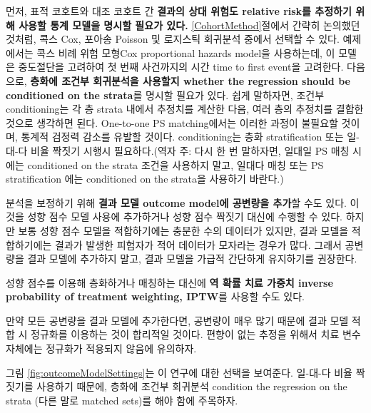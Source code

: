 \documentclass[10.5pt]{book}
\theoremstyle{definition}
\theoremstyle{definition}
\theoremstyle{definition}
\theoremstyle{remark}
\begin{document}
먼저, 표적 코호트와 대조 코호트 간 \textbf{결과의 상대 위험도 relative
risk를 추정하기 위해 사용할 통계 모델을 명시할 필요가 있다.}
\ref{CohortMethod}절에서 간략히 논의했던 것처럼, 콕스 Cox, 포아송
Poisson 및 로지스틱 회귀분석 중에서 선택할 수 있다. 예제에서는 콕스 비례
위험 모형Cox proportional hazards model을 사용하는데, 이 모델은
중도절단을 고려하여 첫 번째 사건까지의 시간 time to first event을
고려한다. 다음으로, \textbf{층화에 조건부 회귀분석을 사용할지 whether
the regression should be conditioned on the strata}를 명시할 필요가
있다. 쉽게 말하자면, 조건부 conditioning는 각 층 strata 내에서 추정치를
계산한 다음, 여러 층의 추정치를 결합한 것으로 생각하면 된다. One-to-one
PS matching에서는 이러한 과정이 불필요할 것이며, 통계적 검정력 감소를
유발할 것이다. conditioning는 층화 stratification 또는 일-대-다 비율
짝짓기 시행시 필요하다.(역자 주: 다시 한 번 말하자면, 일대일 PS 매칭
시에는 conditioned on the strata 조건을 사용하지 말고, 일대다 매칭 또는
PS stratification 에는 conditioned on the strata을 사용하기 바란다.)

분석을 보정하기 위해 \textbf{결과 모델 outcome model에 공변량을 추가}할
수도 있다. 이것을 성향 점수 모델 사용에 추가하거나 성향 점수 짝짓기
대신에 수행할 수 있다. 하지만 보통 성향 점수 모델을 적합하기에는 충분한
수의 데이터가 있지만, 결과 모델을 적합하기에는 결과가 발생한 피험자가
적어 데이터가 모자라는 경우가 많다. 그래서 공변량을 결과 모델에 추가하지
말고, 결과 모델을 가급적 간단하게 유지하기를 권장한다.

성향 점수를 이용해 층화하거나 매칭하는 대신에 \textbf{역 확률 치료
가중치 inverse probability of treatment weighting, IPTW}를 사용할 수도
있다.

만약 모든 공변량을 결과 모델에 추가한다면, 공변량이 매우 많기 때문에
결과 모델 적합 시 정규화를 이용하는 것이 합리적일 것이다. 편향이 없는
추정을 위해서 치료 변수 자체에는 정규화가 적용되지 않음에 유의하자.

그림 \ref{fig:outcomeModelSettings}는 이 연구에 대한 선택을 보여준다.
일-대-다 비율 짝짓기를 사용하기 때문에, 층화에 조건부 회귀분석 condition
the regression on the strata (다른 말로 matched sets)를 해야 함에
주목하자.
\end{document}
